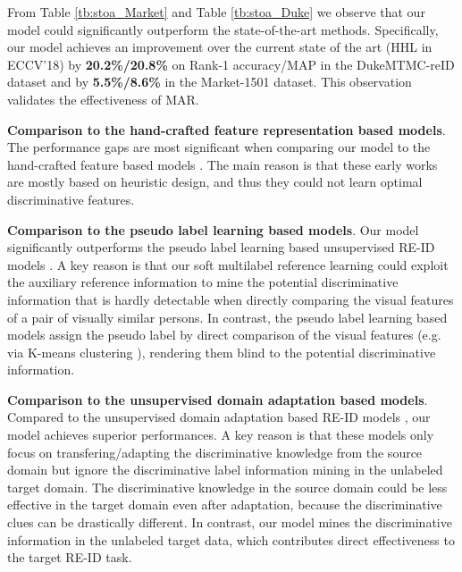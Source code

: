 \documentclass[10pt,twocolumn,letterpaper]{article}
\newcommand{\jason}[1]{{\color{black}#1}}
\begin{document}
From Table \ref{tb:stoa_Market} and Table \ref{tb:stoa_Duke}
we observe that our model could significantly outperform the state-of-the-art methods.
Specifically, our model achieves an improvement over the current state
of the art (HHL in ECCV'18)
by \textbf{20.2\%/20.8\%} \jason{on} Rank-1 accuracy/MAP in the DukeMTMC-reID dataset
and by \textbf{5.5\%/8.6\%} in the Market-1501 dataset.
This observation validates the effectiveness of MAR.

\vspace{0.1cm}
\noindent
\textbf{Comparison to the hand-crafted feature representation based models}.
The performance gaps are most significant when comparing our model to the hand-crafted feature based models
\cite{2015_CVPR_LOMO,2015_ICCV_MARKET,Dic,ISR,2016_CVPR_tDIC}.
The main reason is that these early works
are mostly based on heuristic design, and thus they could not learn optimal discriminative features.

\vspace{0.1cm}
\noindent
\textbf{Comparison to the pseudo label learning based models}.
Our model significantly outperforms the pseudo label learning based unsupervised RE-ID models \cite{2017_ICCV_asymmetric,2017_Arxiv_PUL}.
A key reason is that
our soft multilabel reference learning could exploit the auxiliary reference information to mine the potential discriminative information
that is hardly detectable when directly comparing the visual features of a pair of visually similar persons.
In contrast,
the pseudo label learning based models assign the pseudo label
by direct comparison of the visual features (e.g. via K-means clustering \cite{2017_ICCV_asymmetric,2017_Arxiv_PUL}),
rendering them blind to the potential discriminative information.

\vspace{0.1cm}
\noindent
\textbf{Comparison to the unsupervised domain adaptation based models}.
Compared to the unsupervised domain adaptation based RE-ID models \cite{2018_CVPR_PTGAN,2018_CVPR_SPGAN,2018_ECCV_HHL,2018_CVPR_transferable},
our model achieves superior performances.
A key reason is that these models only focus on
transfering/adapting the discriminative knowledge from the source domain
but ignore the discriminative label information mining in the unlabeled target domain.
The discriminative knowledge in the source domain could be less effective in the target domain even after adaptation,
because the discriminative clues can be drastically different.
In contrast, our model mines the discriminative information in the unlabeled target data,
which contributes direct effectiveness to the target RE-ID task.
\end{document}
